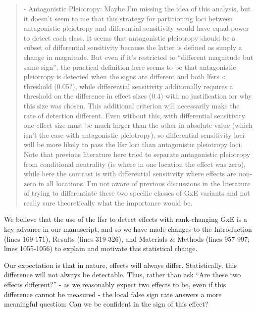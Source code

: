 \documentclass[
  letterpaper,
  DIV=11,
  numbers=noendperiod]{scrartcl}
\begin{document}
\begin{quote}
\begin{tcolorbox}[enhanced jigsaw, colframe=quarto-callout-warning-color-frame, rightrule=.15mm, leftrule=.75mm, left=2mm, breakable, toprule=.15mm, arc=.35mm, bottomrule=.15mm, opacityback=0, colback=white]

- Antagonistic Pleiotropy: Maybe I'm missing the idea of this analysis,
but it doesn't seem to me that this strategy for partitioning loci
between antagonistic pleiotropy and differential sensitivity would have
equal power to detect each class. It seems that antagonistic pleiotropy
should be a subset of differential sensitivity because the latter is
defined as simply a change in magnitude. But even if it's restricted to
``different magnitude but same sign'', the practical definition here
seems to be that antagonistic pleiotropy is detected when the signs are
different and both lfsrs \textless{} threshold (0.05?), while
differential sensitivity additionally requires a threshold on the
difference in effect sizes (0.4) with no justification for why this size
was chosen. This additional criterion will necessarily make the rate of
detection different. Even without this, with differential sensitivity
one effect size must be much larger than the other in absolute value
(which isn't the case with antagonistic pleiotropy), so differential
sensitivity loci will be more likely to pass the lfsr loci than
antagonistic pleiotropy loci. Note that previous literature here tried
to separate antagonistic pleiotropy from conditional neutrality (ie
where in one location the effect was zero), while here the contrast is
with differential sensitivity where effects are non-zero in all
locations. I'm not aware of previous discussions in the literature of
trying to differentiate these two specific classes of GxE variants and
not really sure theoretically what the importance would be.

\end{tcolorbox}
\end{quote}

We believe that the use of the lfsr to detect effects with rank-changing
GxE is a key advance in our manuscript, and so we have made changes to
the Introduction (lines 169-171), Results (lines 319-326), and Materials
\& Methods (lines 957-997; lines 1055-1056) to explain and motivate this
statistical change.

Our expectation is that in nature, effects will always differ.
Statistically, this difference will not always be detectable. Thus,
rather than ask ``Are these two effects different?'' - as we reasonably
expect two effects to be, even if this difference cannot be measured -
the local false sign rate answers a more meaningful question: Can we be
confident in the sign of this effect?
\end{document}
